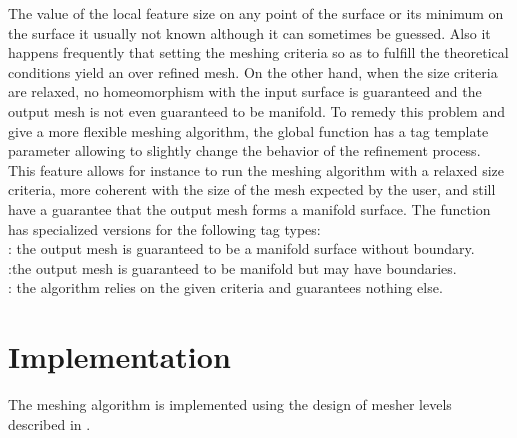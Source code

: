 The value of the local feature size on any point of the surface
or its minimum on the surface it usually not known
although it can sometimes be guessed. Also it happens frequently
that setting the meshing criteria so as to fulfill the theoretical
conditions yield an over refined mesh.
On the other hand, when the size criteria are relaxed,
no homeomorphism with the input surface is guaranteed
and the output mesh is not even guaranteed to be manifold.
To remedy this problem and give a more flexible
meshing algorithm, the global function 
 has a tag template parameter
allowing to slightly change the behavior of the refinement process.
This feature allows for instance to run the meshing
algorithm with a relaxed size criteria, more coherent
with the size of the mesh expected by the user,
and still have a guarantee that
the output mesh forms a manifold surface.
The function  has specialized versions
for the following  tag types: \\
: the output mesh is guaranteed to be a manifold
surface without boundary.\\
:the output mesh is guaranteed to be
manifold but may have boundaries.\\
: the algorithm relies on the given criteria and
guarantees nothing else.

\section{Implementation}

The meshing algorithm is implemented using the design of mesher levels
described in \cite{cgal:ry-gsddrm-06}. 




